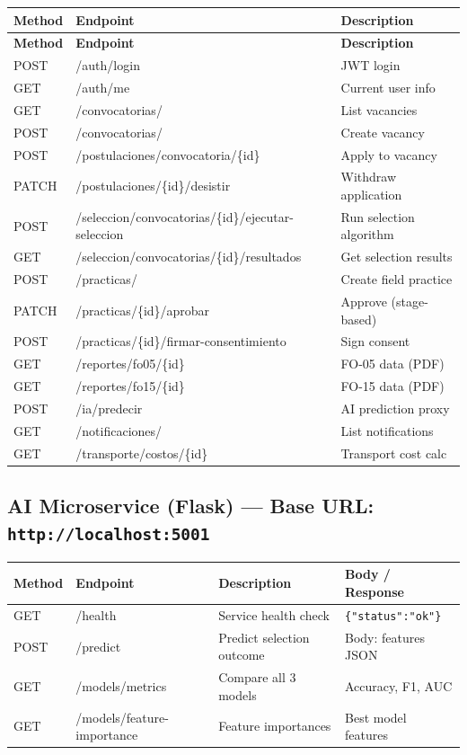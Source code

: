 \documentclass[12pt,a4paper]{article}
\begin{document}
\begin{longtable}{>{\ttfamily}p{1.4cm} >{\ttfamily}p{5.8cm} p{5.5cm}}
  \toprule
  \textbf{Method} & \textbf{Endpoint} & \textbf{Description} \\
  \midrule
  \endfirsthead \toprule \textbf{Method} & \textbf{Endpoint} & \textbf{Description} \\ \midrule \endhead
  POST & /auth/login & JWT login \\
  GET  & /auth/me & Current user info \\
  GET  & /convocatorias/ & List vacancies \\
  POST & /convocatorias/ & Create vacancy \\
  POST & /postulaciones/convocatoria/\{id\} & Apply to vacancy \\
  PATCH & /postulaciones/\{id\}/desistir & Withdraw application \\
  POST & /seleccion/convocatorias/\{id\}/ejecutar-seleccion & Run selection algorithm \\
  GET  & /seleccion/convocatorias/\{id\}/resultados & Get selection results \\
  POST & /practicas/ & Create field practice \\
  PATCH & /practicas/\{id\}/aprobar & Approve (stage-based) \\
  POST & /practicas/\{id\}/firmar-consentimiento & Sign consent \\
  GET  & /reportes/fo05/\{id\} & FO-05 data (PDF) \\
  GET  & /reportes/fo15/\{id\} & FO-15 data (PDF) \\
  POST & /ia/predecir & AI prediction proxy \\
  GET  & /notificaciones/ & List notifications \\
  GET  & /transporte/costos/\{id\} & Transport cost calc \\
  \bottomrule
\end{longtable}

\subsection{AI Microservice (Flask) — Base URL: \texttt{http://localhost:5001}}

\begin{longtable}{>{\ttfamily}p{1.4cm} >{\ttfamily}p{4cm} p{4cm} p{3cm}}
  \toprule
  \textbf{Method} & \textbf{Endpoint} & \textbf{Description} & \textbf{Body / Response} \\
  \midrule
  GET  & /health & Service health check & \texttt{\{"status":"ok"\}} \\
  POST & /predict & Predict selection outcome & Body: features JSON \\
  GET  & /models/metrics & Compare all 3 models & Accuracy, F1, AUC \\
  GET  & /models/feature-importance & Feature importances & Best model features \\
  \bottomrule
\end{longtable}
\end{document}
